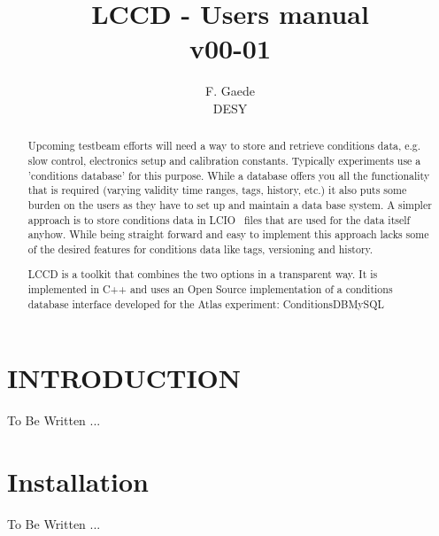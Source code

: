 \documentclass[twoside]{article}
\newif\ifpdf\ifx\pdfoutput\undefined\pdffalse\else\pdfoutput=1\pdftrue\fi
\newcommand{\pdfgraphics}{\ifpdf\DeclareGraphicsExtensions{.png,.jpg}\fi}
\newcommand{\captionstyle}[1]{\textit{\normal{#1}}}
\begin{document}
\pdfgraphics

\title{{\Huge\bf LCCD -  Users manual} \\ v00-01}

\author{F. Gaede \\  DESY}


\maketitle
\setcounter{tocdepth}{2}
\tableofcontents


\begin{abstract}
Upcoming testbeam efforts will need a way to store and retrieve conditions data, e.g. 
slow control, electronics setup and calibration constants. 
Typically experiments use a 'conditions database' for this purpose. 
While a database offers you all the functionality that is required 
(varying validity time ranges, tags, history, etc.) it also puts some burden on the users
as they have to set up and maintain a data base system. 
A simpler approach is to store conditions data in LCIO~\cite{lcio_home} files that are used for the data itself 
anyhow.
While being straight forward and easy to implement this approach lacks some of the desired
features  for conditions data  like tags, versioning and history. 

LCCD is a toolkit that combines the two options in a transparent way.
It is implemented in C++ and uses an Open Source implementation of a conditions database 
interface developed for the Atlas experiment: ConditionsDBMySQL~\cite{conddb_home}

\end{abstract}

\newpage
\section{INTRODUCTION \label{intro}}

{\Large To Be Written ...}

\section{Installation}
{\Large To Be Written ...}
\end{document}
